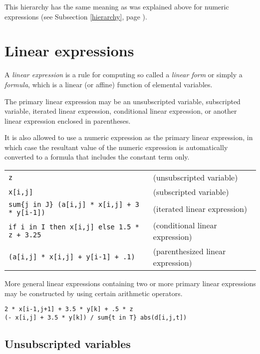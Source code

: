 \documentclass[11pt]{report}
\def\para#1{\noindent{\bf#1}}
\begin{document}
This hierarchy has the same meaning as was explained above for numeric
expressions (see Subsection \ref{hierarchy}, page \pageref{hierarchy}).

\section{Linear expressions}

A {\it linear expression} is a rule for computing so called
a {\it linear form} or simply a {\it formula}, which is a linear (or
affine) function of elemental variables.

The primary linear expression may be an unsubscripted variable,
subscripted variable, iterated linear expression, conditional linear
expression, or another linear expression enclosed in parentheses.

It is also allowed to use a numeric expression as the primary linear
expression, in which case the resultant value of the numeric expression
is automatically converted to a formula that includes the constant term
only.

\para{Examples}

\noindent
\begin{tabular}{@{}ll@{}}
\verb|z| &(unsubscripted variable)\\
\verb|x[i,j]| &(subscripted variable)\\
\verb|sum{j in J} (a[i,j] * x[i,j] + 3 * y[i-1])| &
(iterated linear expression)\\
\verb|if i in I then x[i,j] else 1.5 * z + 3.25| &
(conditional linear expression)\\
\verb|(a[i,j] * x[i,j] + y[i-1] + .1)| &
(parenthesized linear expression)\\
\end{tabular}

More general linear expressions containing two or more primary linear
expressions may be constructed by using certain arithmetic operators.

\para{Examples}

\begin{verbatim}
2 * x[i-1,j+1] + 3.5 * y[k] + .5 * z
(- x[i,j] + 3.5 * y[k]) / sum{t in T} abs(d[i,j,t])
\end{verbatim}

\vspace*{-5pt}

\subsection{Unsubscripted variables}
\end{document}
